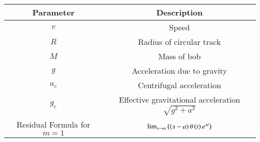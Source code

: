 \begin{tabular}{ | c | c | }
    \hline
    Parameter & Description \\
    \hline
    $v$ & Speed \\
    \hline
    $R$ & Radius of circular track \\
    \hline
    $M$ & Mass of bob \\
    \hline
    $g$ & Acceleration due to gravity \\
    \hline
    $a_c$ & Centrifugal acceleration \\
    \hline
    $g_e$ & Effective gravitational acceleration $\sqrt{g^2 + a^2}$ \\
    \hline
    Residual Formula for $m = 1$ & $\lim_{s \to a}\left(\left(s - a\right)\theta\left(t\right)e^{st}\right)$\\
    \hline
\end{tabular}